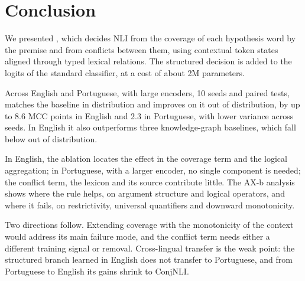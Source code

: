 \FloatBarrier
\section{Conclusion}
\label{sec:conclusion}

We presented \model{}, which decides NLI from the coverage of each hypothesis word by the premise and
from conflicts between them, using contextual token states aligned through typed lexical relations. The
structured decision is added to the logits of the standard classifier, at a cost of about 2M parameters.

Across English and Portuguese, with large encoders, 10 seeds and paired tests, \model{} matches the
\cls{} baseline in distribution and improves on it out of distribution, by up to 8.6 MCC points in English
and 2.3 in Portuguese, with lower variance across seeds. In English it also outperforms three
knowledge-graph baselines, which fall below \cls{} out of distribution.

In English, the ablation locates the effect in the coverage term and the logical aggregation; in
Portuguese, with a larger encoder, no single component is needed; the conflict term,
the lexicon and its source contribute little. The AX-b analysis shows where the rule helps, on argument
structure and logical operators, and where it fails, on restrictivity, universal quantifiers and
downward monotonicity.

Two directions follow. Extending coverage with the monotonicity of the context would address its main
failure mode, and the conflict term needs either a different training signal or removal. Cross-lingual
transfer is the weak point: the structured branch learned in English does not transfer to Portuguese,
and from Portuguese to English its gains shrink to ConjNLI.
